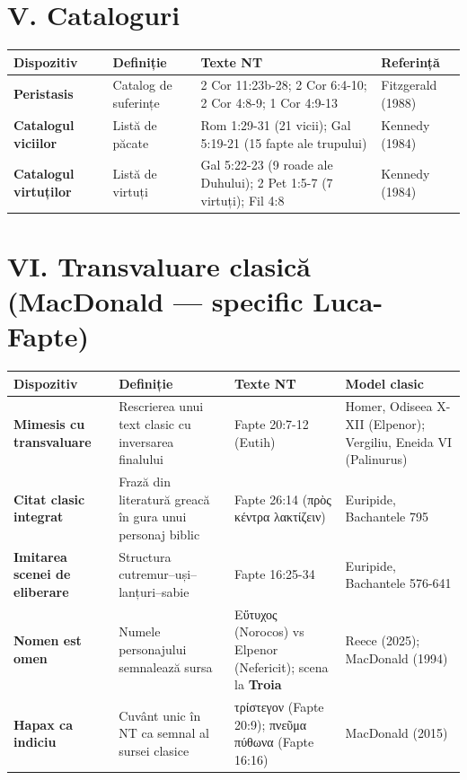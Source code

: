 \documentclass[12pt,a4paper,twoside,openany]{book}
\begin{document}
\section*{V. Cataloguri}
\begin{center}
\footnotesize
\begin{tabular}{L{2.2cm}L{3cm}L{4.5cm}L{3cm}}
\toprule
{}
\textbf{Dispozitiv} & \textbf{Definiție} & \textbf{Texte NT} & \textbf{Referință} \\
\midrule
\textbf{Peristasis} & Catalog de suferințe & 2 Cor 11:23b-28; 2 Cor 6:4-10; 2 Cor 4:8-9; 1 Cor 4:9-13 & Fitzgerald (1988) \\
\textbf{Catalogul viciilor} & Listă de păcate & Rom 1:29-31 (21 vicii); Gal 5:19-21 (15 fapte ale trupului) & Kennedy (1984) \\
\textbf{Catalogul virtuților} & Listă de virtuți & Gal 5:22-23 (9 roade ale Duhului); 2 Pet 1:5-7 (7 virtuți); Fil 4:8 & Kennedy (1984) \\
\bottomrule
\end{tabular}
\end{center}

\section*{VI. Transvaluare clasică (MacDonald --- specific Luca-Fapte)}
\begin{center}
\footnotesize
\begin{tabular}{L{2.2cm}L{3cm}L{3.5cm}L{3.5cm}}
\toprule
{}
\textbf{Dispozitiv} & \textbf{Definiție} & \textbf{Texte NT} & \textbf{Model clasic} \\
\midrule
\textbf{Mimesis cu transvaluare} & Rescrierea unui text clasic cu inversarea finalului & Fapte 20:7-12 (Eutih) & Homer, Odiseea X-XII (Elpenor); Vergiliu, Eneida VI (Palinurus) \\
\textbf{Citat clasic integrat} & Frază din literatură greacă în gura unui personaj biblic & Fapte 26:14 (πρὸς κέντρα λακτίζειν) & Euripide, Bachantele 795 \\
\textbf{Imitarea scenei de eliberare} & Structura cutremur--uși--lanțuri--sabie & Fapte 16:25-34 & Euripide, Bachantele 576-641 \\
\textbf{Nomen est omen} & Numele personajului semnalează sursa & Εὔτυχος (Norocos) vs Elpenor (Nefericit); scena la \textbf{Troia} & Reece (2025); MacDonald (1994) \\
\textbf{Hapax ca indiciu} & Cuvânt unic în NT ca semnal al sursei clasice & τρίστεγον (Fapte 20:9); πνεῦμα πύθωνα (Fapte 16:16) & MacDonald (2015) \\
\bottomrule
\end{tabular}
\end{center}
\normalsize
\end{document}

